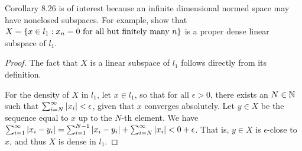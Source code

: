 \begin{exercise}{89}
Corollary 8.26 is of interest because an infinite dimensional normed space may have nonclosed subspaces.
For example, show that $X=\{x\in l_1: x_n=0\text{ for all but finitely many }n\}$ is a proper dense linear subspace of $l_1$.
\end{exercise}
\begin{proof}
The fact that $X$ is a linear subspace of $l_1$ follows directly from its definition.

For the density of $X$ in $l_1$, let $x\in l_1$, so that for all $\epsilon>0$, there exists an $N\in\mathbb{N}$ such that $\sum_{i=N}^\infty \left\lvert x_i\right\rvert <\epsilon$, given that $x$ converges absolutely.
Let $y\in X$ be the sequence equal to $x$ up to the $N$-th element.
We have $\sum_{i=1}^\infty \left\lvert x_i - y_i\right\rvert = \sum_{i=1}^{N-1} \left\lvert x_i - y_i\right\rvert + \sum_{i=N}^\infty\left\lvert x_i\right\rvert < 0 + \epsilon$.
That is, $y\in X$ is $\epsilon$-close to $x$, and thus $X$ is dense in $l_1$.
\end{proof} 
